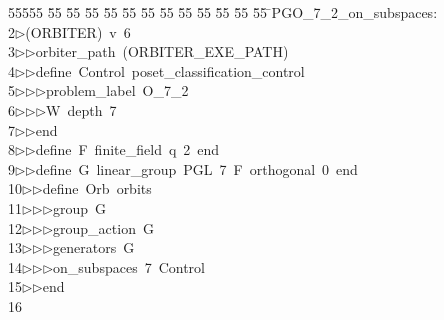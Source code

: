 %
%
\begin{tabbing}
55555 \= 55 \= 55 \= 55 \= 55 \= 55 \= 55 \= 55 \= 55 \= 55 \= 55 \= 55 \= 55 \= \>PGO\_7\_2\_on\_subspaces:\\[0pt]
2\>$\triangleright$\>(ORBITER)\ v\ 6\ \\[0pt]
3\>$\triangleright$\>$\triangleright$\>orbiter\_path\ (ORBITER\_EXE\_PATH)\ \\[0pt]
4\>$\triangleright$\>$\triangleright$\>define\ Control\ poset\_classification\_control\ \\[0pt]
5\>$\triangleright$\>$\triangleright$\>$\triangleright$\>problem\_label\ O\_7\_2\ \\[0pt]
6\>$\triangleright$\>$\triangleright$\>$\triangleright$\>W\ depth\ 7\ \\[0pt]
7\>$\triangleright$\>$\triangleright$\>end\ \\[0pt]
8\>$\triangleright$\>$\triangleright$\>define\ F\ finite\_field\ q\ 2\ end\ \\[0pt]
9\>$\triangleright$\>$\triangleright$\>define\ G\ linear\_group\ PGL\ 7\ F\ orthogonal\ 0\ end\ \\[0pt]
10\>$\triangleright$\>$\triangleright$\>define\ Orb\ orbits\ \\[0pt]
11\>$\triangleright$\>$\triangleright$\>$\triangleright$\>group\ G\ \\[0pt]
12\>$\triangleright$\>$\triangleright$\>$\triangleright$\>group\_action\ G\ \\[0pt]
13\>$\triangleright$\>$\triangleright$\>$\triangleright$\>generators\ G\ \\[0pt]
14\>$\triangleright$\>$\triangleright$\>$\triangleright$\>on\_subspaces\ 7\ Control\ \\[0pt]
15\>$\triangleright$\>$\triangleright$\>end\\[0pt]
16\>\end{tabbing}
